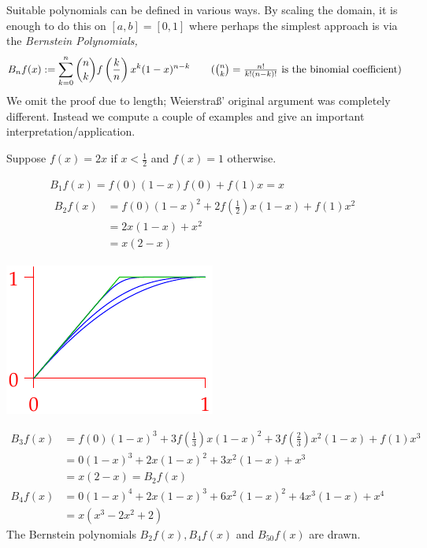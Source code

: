 Suitable polynomials can be defined in various ways. By scaling the domain, it is enough to do this on $[a,b]=[0,1]$ where perhaps the simplest approach is via the \emph{Bernstein Polynomials,}
\[
	B_nf(x):=\sum_{k=0}^n \binom nkf\left(\frac kn\right) x^k(1-x)^{n-k} \tag{$\binom nk=\frac{n!}{k!(n-k)!}$ is the binomial coefficient}
\]
We omit the proof due to length; Weierstraß' original argument was completely different. Instead we compute a couple of examples and give an important interpretation/application.


\begin{examples}{}{}
	\exstart Suppose $f(x)=2x$ if $x<\frac 12$ and $f(x)=1$ otherwise.
	  
	\begin{enumerate}\setcounter{enumi}{1}
	 	\begin{minipage}[t]{0.6\linewidth}\vspace{-20pt}
			\item[]\begin{gather*}
	  		B_1f(x)=f(0)(1-x)f(0)+f(1)x=x\\[6pt]
			  \begin{aligned}
				  B_2f(x)&=f(0)(1-x)^2+2f(\tfrac 12)x(1-x)+f(1)x^2\\
				  &=2x(1-x)+x^2\\
				  &=x(2-x)
			  \end{aligned}
	  	\end{gather*}
		\end{minipage}
		\hfill
		\begin{minipage}[t]{0.39\linewidth}\vspace{-25pt}
			\flushright\includegraphics[scale=0.95]{bernstein}
		\end{minipage}\par\vspace{-10pt}
	  \begin{align*}
		  B_3f(x)&=f(0)(1-x)^3+3f(\tfrac 13)x(1-x)^2+3f(\tfrac 23)x^2(1-x)+f(1)x^3\\
		  &= 0(1-x)^3+ 2x(1-x)^2+3x^2(1-x)+x^3\\
		  &=x(2-x)=B_2f(x)\\[5pt]
		  B_4f(x)&=0(1-x)^4+2x(1-x)^3+ 6x^2(1-x)^2 +4x^3(1-x)+x^4\\
		  &=x(x^3-2x^2+2)
		\end{align*}
		The Bernstein polynomials $B_2f(x), B_4f(x)$ and $B_{50}f(x)$ are drawn.
		

\end{enumerate}
\end{examples}
